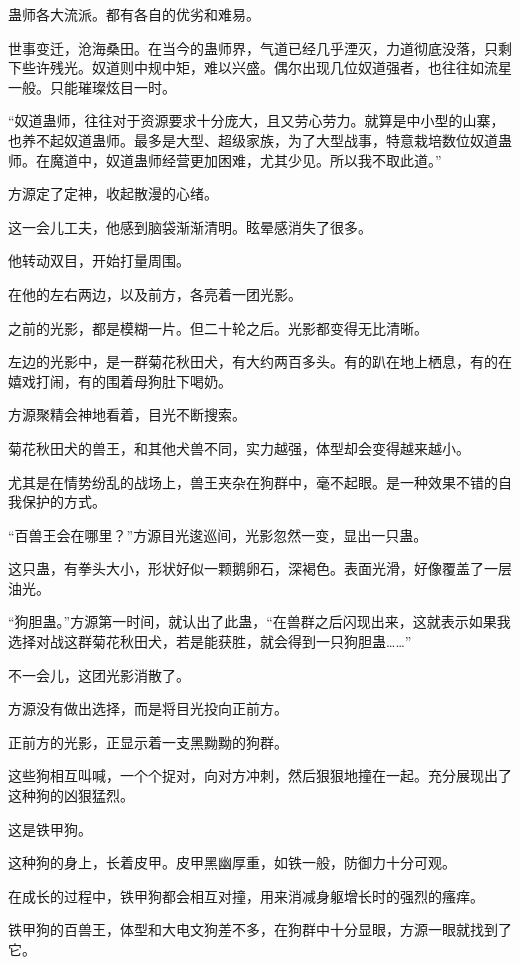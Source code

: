 \begin{this_body}
蛊师各大流派。都有各自的优劣和难易。

世事变迁，沧海桑田。在当今的蛊师界，气道已经几乎湮灭，力道彻底没落，只剩下些许残光。奴道则中规中矩，难以兴盛。偶尔出现几位奴道强者，也往往如流星一般。只能璀璨炫目一时。

“奴道蛊师，往往对于资源要求十分庞大，且又劳心劳力。就算是中小型的山寨，也养不起奴道蛊师。最多是大型、超级家族，为了大型战事，特意栽培数位奴道蛊师。在魔道中，奴道蛊师经营更加困难，尤其少见。所以我不取此道。”

方源定了定神，收起散漫的心绪。

这一会儿工夫，他感到脑袋渐渐清明。眩晕感消失了很多。

他转动双目，开始打量周围。

在他的左右两边，以及前方，各亮着一团光影。

之前的光影，都是模糊一片。但二十轮之后。光影都变得无比清晰。

左边的光影中，是一群菊花秋田犬，有大约两百多头。有的趴在地上栖息，有的在嬉戏打闹，有的围着母狗肚下喝奶。

方源聚精会神地看着，目光不断搜索。

菊花秋田犬的兽王，和其他犬兽不同，实力越强，体型却会变得越来越小。

尤其是在情势纷乱的战场上，兽王夹杂在狗群中，毫不起眼。是一种效果不错的自我保护的方式。

“百兽王会在哪里？”方源目光逡巡间，光影忽然一变，显出一只蛊。

这只蛊，有拳头大小，形状好似一颗鹅卵石，深褐色。表面光滑，好像覆盖了一层油光。

“狗胆蛊。”方源第一时间，就认出了此蛊，“在兽群之后闪现出来，这就表示如果我选择对战这群菊花秋田犬，若是能获胜，就会得到一只狗胆蛊……”

不一会儿，这团光影消散了。

方源没有做出选择，而是将目光投向正前方。

正前方的光影，正显示着一支黑黝黝的狗群。

这些狗相互叫喊，一个个捉对，向对方冲刺，然后狠狠地撞在一起。充分展现出了这种狗的凶狠猛烈。

这是铁甲狗。

这种狗的身上，长着皮甲。皮甲黑幽厚重，如铁一般，防御力十分可观。

在成长的过程中，铁甲狗都会相互对撞，用来消减身躯增长时的强烈的瘙痒。

铁甲狗的百兽王，体型和大电文狗差不多，在狗群中十分显眼，方源一眼就找到了它。


\end{this_body}
